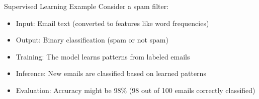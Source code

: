 \begin{example2}{Supervised Learning Example}
Consider a spam filter:
\begin{itemize}
    \item Input: Email text (converted to features like word frequencies)
    \item Output: Binary classification (spam or not spam)
    \item Training: The model learns patterns from labeled emails
    \item Inference: New emails are classified based on learned patterns
    \item Evaluation: Accuracy might be 98\% (98 out of 100 emails correctly classified)
\end{itemize}
\end{example2}


